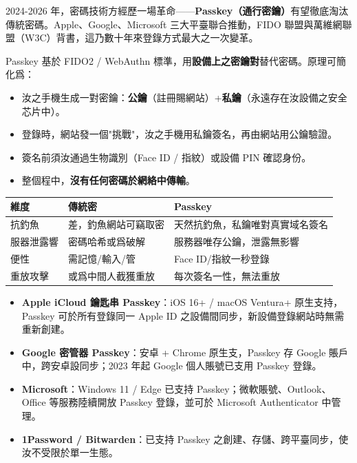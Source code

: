 
2024-2026 年，密碼技術方經歷一場革命——\textbf{Passkey（通行密鑰）}有望徹底淘汰傳統密碼。Apple、Google、Microsoft 三大平臺聯合推動，FIDO 聯盟與萬維網聯盟（W3C）背書，這乃數十年來登錄方式最大之一次變革。


Passkey 基於 FIDO2 / WebAuthn 標準，用\textbf{設備上之密鑰對}替代密碼。原理可簡化爲：

\begin{itemize}
  \item 汝之手機生成一對密鑰：\textbf{公鑰}（註冊賜網站）+\textbf{私鑰}（永遠存在汝設備之安全芯片中）。
  \item 登錄時，網站發一個"挑戰"，汝之手機用私鑰簽名，再由網站用公鑰驗證。
  \item 簽名前須汝通過生物識別（Face ID / 指紋）或設備 PIN 確認身份。
  \item 整個程中，\textbf{沒有任何密碼於網絡中傳輸}。
\end{itemize}


\begin{center}
\begin{tabularx}{\linewidth}{|X|X|X|}
\hline
\textbf{維度} & \textbf{傳統密} & \textbf{Passkey} \tabularnewline
\hline
抗釣魚 & 差，釣魚網站可竊取密 & 天然抗釣魚，私鑰唯對真實域名簽名 \tabularnewline
服器泄露響 & 密碼哈希或爲破解 & 服務器唯存公鑰，泄露無影響 \tabularnewline
便性 & 需記憶/輸入/管 & Face ID/指紋一秒登錄 \tabularnewline
重放攻擊 & 或爲中間人截獲重放 & 每次簽名一性，無法重放 \tabularnewline
\hline
\end{tabularx}
\end{center}


\begin{itemize}
  \item \textbf{Apple iCloud 鑰匙串 Passkey}：iOS 16+ / macOS Ventura+ 原生支持，Passkey 可於所有登錄同一 Apple ID 之設備間同步，新設備登錄網站時無需重新創建。
  \item \textbf{Google 密管器 Passkey}：安卓 + Chrome 原生支，Passkey 存 Google 賬戶中，跨安卓設同步；2023 年起 Google 個人賬號已支用 Passkey 登錄。
  \item \textbf{Microsoft}：Windows 11 / Edge 已支持 Passkey；微軟賬號、Outlook、Office 等服務陸續開放 Passkey 登錄，並可於 Microsoft Authenticator 中管理。
  \item \textbf{1Password / Bitwarden}：已支持 Passkey 之創建、存儲、跨平臺同步，使汝不受限於單一生態。
\end{itemize}

